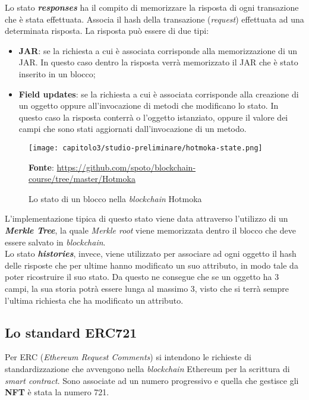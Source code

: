 Lo stato \textbf{\textit{responses}} ha il compito di memorizzare la risposta di ogni transazione che è stata effettuata. Associa il hash della transazione (\textit{request}) effettuata ad una determinata risposta. 
La risposta può essere di due tipi:
\begin{itemize}
  \item \textbf{JAR}: se la richiesta a cui è associata corrisponde alla memorizzazione di un JAR. In questo caso dentro la risposta verrà memorizzato il JAR che è stato inserito in un blocco;
  \item \textbf{Field updates}: se la richiesta a cui è associata corrisponde alla creazione di un oggetto oppure all'invocazione di metodi che modificano lo stato. In questo caso la risposta conterrà o l'oggetto istanziato, oppure il valore dei campi che sono stati aggiornati dall'invocazione di un metodo.
\end{itemize}

\begin{figure}[h!]
  \centering
  \texttt{[image: capitolo3/studio-preliminare/hotmoka-state.png]}
  \caption{Lo stato di un blocco nella \textit{blockchain} Hotmoka}
  \textbf{Fonte}: \href{https://github.com/spoto/blockchain-course/tree/master/Hotmoka}{https://github.com/spoto/blockchain-course/tree/master/Hotmoka}
\end{figure}

L'implementazione tipica di questo stato viene data attraverso l'utilizzo di un \textbf{\textit{Merkle Tree}}, la quale \textit{Merkle root} viene memorizzata dentro il blocco che deve essere salvato in \textit{blockchain}. \\

Lo stato \textbf{\textit{histories}}, invece, viene utilizzato per associare ad ogni oggetto il hash delle risposte che per ultime hanno modificato un suo attributo, in modo tale da poter ricostruire il suo stato. Da questo ne consegue che se un oggetto ha 3 campi, la sua storia potrà essere lunga al massimo 3, visto che si terrà sempre l'ultima richiesta che ha modificato un attributo.


\subsection{Lo standard ERC721}
Per ERC (\textit{Ethereum Request Comments}) si intendono le richieste di standardizzazione che avvengono nella \textit{blockchain} Ethereum per la scrittura di \textit{smart contract}. Sono associate ad un numero progressivo e quella che gestisce gli \textbf{NFT} è stata la numero 721. \\

